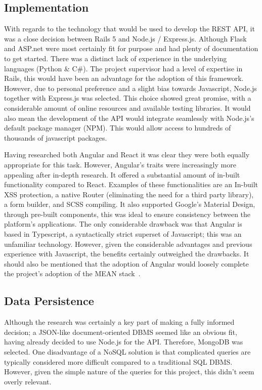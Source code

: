 \subsection{Implementation}
With regards to the technology that would be used to develop the REST API, it was a close decision between Rails 5 and Node.js / Express.js. Although Flask and ASP.net were most certainly fit for purpose and had plenty of documentation to get started. There was a distinct lack of experience in the underlying languages (Python \& C\#). The project supervisor had a level of expertise in Rails, this would have been an advantage for the adoption of this framework. However, due to personal preference and a slight bias towards Javascript, Node.js together with Express.js was selected. This choice showed great promise, with a considerable amount of online resources and available testing libraries. It would also mean the development of the API would integrate seamlessly with Node.js's default package manager (NPM). This would allow access to hundreds of thousands of javascript packages.

Having researched both Angular and React it was clear they were both equally appropriate for this task. However, Angular's traits were increasingly more appealing after in-depth research. It offered a substantial amount of in-built functionality compared to React. Examples of these functionalities are an In-built XSS protection, a native Router (eliminating the need for a third party library), a form builder, and SCSS compiling. It also supported Google's Material Design, through pre-built components, this was ideal to ensure consistency between the platform's applications. The only considerable drawback was that Angular is based in Typescript, a syntactically strict superset of Javascript; this was an unfamiliar technology. However, given the considerable advantages and previous experience with Javascript, the benefits certainly outweighed the drawbacks. It should also be mentioned that the adoption of Angular would loosely complete the project's adoption of the MEAN stack~\cite{mean_documentation_ref}.

\subsection{Data Persistence}
Although the research was certainly a key part of making a fully informed decision; a JSON-like document-oriented DBMS seemed like an obvious fit, having already decided to use Node.js for the API. Therefore, MongoDB was selected.  One disadvantage of a NoSQL solution is that complicated queries are typically considered more difficult compared to a traditional SQL DBMS. However, given the simple nature of the queries for this project, this didn't seem overly relevant. 

